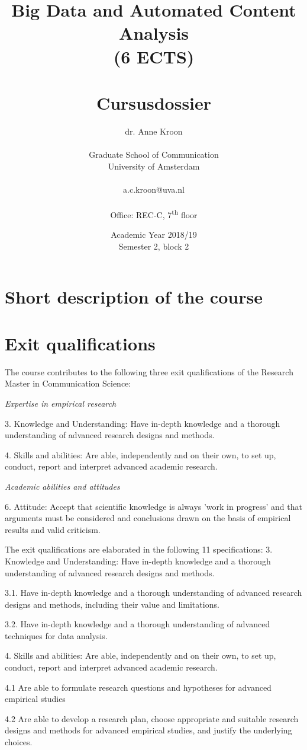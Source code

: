 \documentclass[a4paper,12pt]{report}
\title{Big Data and Automated Content Analysis\\(6 ECTS)\\~\\Cursusdossier}
\author{dr. Anne Kroon\\~\\Graduate School of Communication\\University of Amsterdam\\~\\a.c.kroon@uva.nl\\~\\Office: REC-C, 7\textsuperscript{th} floor}
\date{Academic Year 2018/19\\Semester 2, block 2}
\begin{document}
\maketitle

\tableofcontents


\chapter{Short description of the course}



\chapter{Exit qualifications}

The course contributes to the following three exit qualifications of the Research Master in Communication Science: 


\textit{Expertise in empirical research}


	3.	Knowledge and Understanding: Have in-depth knowledge and a thorough understanding of advanced research designs and methods.


	4.	Skills and abilities: Are able, independently and on their own, to set up, conduct, report and interpret advanced academic research.


\textit{Academic abilities and attitudes}


	6.	Attitude: Accept that scientific knowledge is always 'work in progress' and that arguments must be considered and conclusions drawn on the basis of empirical results and valid criticism.


The exit qualifications are elaborated in the following 11 specifications:
3. Knowledge and Understanding: Have in-depth knowledge and a thorough understanding of advanced research designs and methods. 


3.1. Have in-depth knowledge and a thorough understanding of advanced research designs and methods, including their value and limitations.


3.2.	Have in-depth knowledge and a thorough understanding of advanced techniques for data analysis.


4. Skills and abilities: Are able, independently and on their own, to set up, conduct, report and interpret advanced academic research.


4.1	Are able to formulate research questions and hypotheses for advanced empirical studies


4.2	Are able to develop a research plan, choose appropriate and suitable research designs and methods for advanced empirical studies, and justify the underlying choices. 
\end{document}
